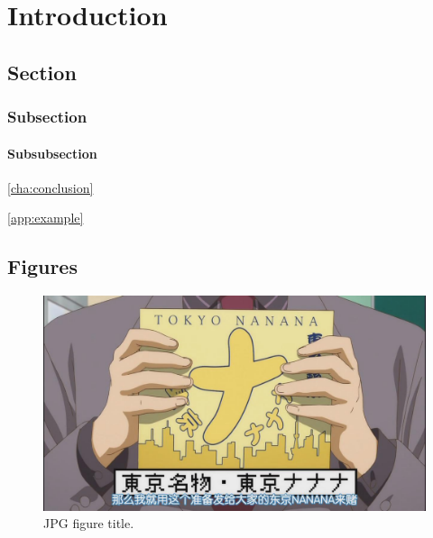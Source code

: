 \chapter{Introduction}

\section{Section}
\subsection{Subsection}
\subsubsection{Subsubsection}


\ref{cha:conclusion}

\ref{app:example}

\section{Figures}

\begin{figure}[ht]
\centering 
\includegraphics[scale=0.4]{Figures/jpgFigure.jpg}
\caption{JPG figure title.}
\label{fig:jpgFigure}
\end{figure}

